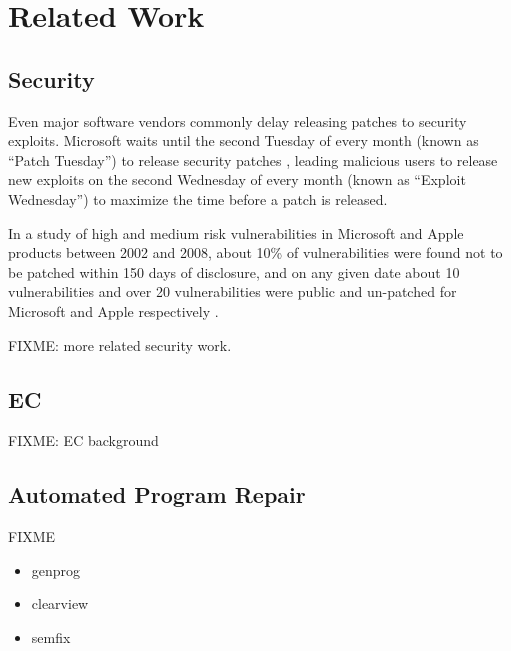 \documentclass{sigcomm-alternate}
\begin{document}
\section{Related Work}
\label{sec-5}
\subsection{Security}
\label{sec-5-1}

Even major software vendors commonly delay releasing patches to
security exploits.  Microsoft waits until the second Tuesday of every
month (known as ``Patch Tuesday'') to release security patches
\cite{lemos2003microsoft}, leading malicious users to release new
exploits on the second Wednesday of every month (known as ``Exploit
Wednesday'') to maximize the time before a patch is released.

In a study of high and medium risk vulnerabilities in Microsoft and
Apple products between 2002 and 2008, about 10\% of
vulnerabilities were found not to be patched within 150 days of
disclosure, and on any given date about 10 vulnerabilities and over 20
vulnerabilities were public and un-patched for Microsoft and Apple
respectively \cite{frei20080}.

FIXME: more related security work.

\subsection{EC}
\label{sec-5-2}

FIXME: EC background

\subsection{Automated Program Repair}
\label{sec-5-3}

FIXME

\begin{itemize}
\item genprog
\item clearview
\item semfix
\end{itemize}
\end{document}
